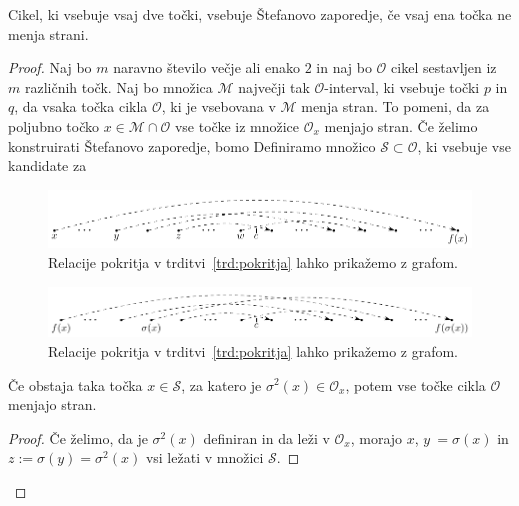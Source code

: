 \documentclass[mat2]{fmfdelo}
\begin{document}
\begin{trditev}
Cikel, ki vsebuje vsaj dve točki, vsebuje Štefanovo zaporedje, če vsaj ena točka ne menja strani.
\end{trditev}
\begin{proof}
Naj bo $m$ naravno število večje ali enako $2$ in naj bo $\mathcal{O}$ cikel sestavljen iz $m$ različnih točk. Naj bo množica $\mathcal{M}$ največji tak $\mathcal{O}$-interval, ki vsebuje točki $p$ in $q$, da vsaka točka cikla $\mathcal{O}$, ki je vsebovana v $\mathcal{M}$ menja stran. To pomeni, da za poljubno točko $x \in \mathcal{M} \cap \mathcal{O}$ vse točke iz množice $\mathcal{O}_x$ menjajo stran. Če želimo konstruirati Štefanovo zaporedje, bomo Definiramo množico $\mathcal{S} \subset \mathcal{O}$, ki vsebuje vse kandidate za 


\begin{figure}[h]
  \centering
  \includegraphics{images/mnozica_S.pdf}
  \caption[Primer vektorske slike.]{Relacije pokritja v trditvi~\ref{trd:pokritja} lahko prikažemo z grafom.}
  \label{fig:S}
\end{figure}

\begin{figure}[h]
  \centering
  \includegraphics{images/sigma.pdf}
  \caption[Primer vektorske slike.]{Relacije pokritja v trditvi~\ref{trd:pokritja} lahko prikažemo z grafom.}
  \label{fig:sigma}
\end{figure}

\begin{lema}
Če obstaja taka točka $x \in \mathcal{S}$, za katero je $\sigma^2(x) \in \mathcal{O}_x$, potem vse točke cikla $\mathcal{O}$ menjajo stran.
\end{lema}
\begin{proof}
Če želimo, da je $\sigma^2(x)$ definiran in da leži v $\mathcal{O}_x$, morajo $x$, $y \:= \sigma(x)$ in $z := \sigma(y) = \sigma^2(x)$ vsi ležati v množici $\mathcal{S}$.
\end{proof}
\end{proof}
\end{document}
